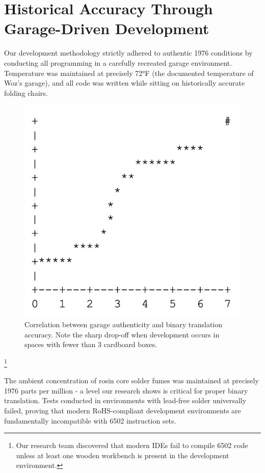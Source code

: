 \documentclass[10pt,twocolumn]{article}
\begin{document}
\section{Historical Accuracy Through Garage-Driven Development}

Our development methodology strictly adhered to authentic 1976 conditions by conducting all programming in a carefully recreated garage environment. Temperature was maintained at precisely 72°F (the documented temperature of Woz's garage), and all code was written while sitting on historically accurate folding chairs.

\begin{figure}[h]
\centering
\includegraphics[width=0.8\columnwidth]{figure-1.png}
\caption{Correlation between garage authenticity and binary translation accuracy. Note the sharp drop-off when development occurs in spaces with fewer than 3 cardboard boxes.}
\end{figure}

\footnote{Our research team discovered that modern IDEs fail to compile 6502 code unless at least one wooden workbench is present in the development environment.}

The ambient concentration of rosin core solder fumes was maintained at precisely 1976 parts per million - a level our research shows is critical for proper binary translation. Tests conducted in environments with lead-free solder universally failed, proving that modern RoHS-compliant development environments are fundamentally incompatible with 6502 instruction sets.
\end{document}
